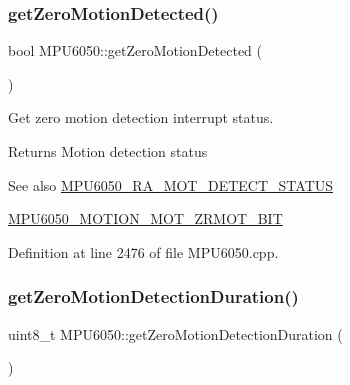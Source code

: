 \subsubsection{\texorpdfstring{getZeroMotionDetected()}{getZeroMotionDetected()}}
{\footnotesize\ttfamily bool M\+P\+U6050\+::get\+Zero\+Motion\+Detected (\begin{DoxyParamCaption}{ }\end{DoxyParamCaption})}

Get zero motion detection interrupt status. \begin{DoxyReturn}{Returns}
Motion detection status 
\end{DoxyReturn}
\begin{DoxySeeAlso}{See also}
\mbox{\hyperlink{MPU6050_8h_a5b725ca4941b1a73f8e4df3d7164d514}{M\+P\+U6050\+\_\+\+R\+A\+\_\+\+M\+O\+T\+\_\+\+D\+E\+T\+E\+C\+T\+\_\+\+S\+T\+A\+T\+US}} 

\mbox{\hyperlink{MPU6050_8h_a851e3f5ae43d03ef3d59916a731a8c6a}{M\+P\+U6050\+\_\+\+M\+O\+T\+I\+O\+N\+\_\+\+M\+O\+T\+\_\+\+Z\+R\+M\+O\+T\+\_\+\+B\+IT}} 
\end{DoxySeeAlso}


Definition at line 2476 of file M\+P\+U6050.\+cpp.


\begin{DoxyCode}{0}

\end{DoxyCode}
\mbox{\label{classMPU6050_a04c0fcdcd0157b6dbf74d4901424801e}} 
\subsubsection{\texorpdfstring{getZeroMotionDetectionDuration()}{getZeroMotionDetectionDuration()}}
{\footnotesize\ttfamily uint8\+\_\+t M\+P\+U6050\+::get\+Zero\+Motion\+Detection\+Duration (\begin{DoxyParamCaption}{ }\end{DoxyParamCaption})}

